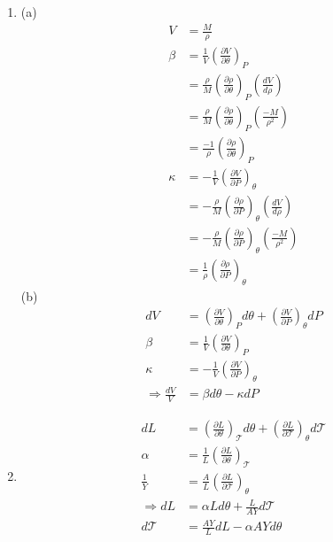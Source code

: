 \documentclass[a4paper,12pt]{article}
\begin{document}
\begin{enumerate}
	\item (a)
	\begin{align*}
		V &= \frac{M}{\rho} \\
		\beta &= \frac{1}{V} \left( \frac{\partial V}{\partial \theta} \right)_P \\
		&= \frac{\rho}{M} \left( \frac{\partial \rho}{\partial \theta} \right)_P \left( \frac{dV}{d\rho} \right) \\
		&= \frac{\rho}{M} \left( \frac{\partial \rho}{\partial \theta} \right)_P \left( \frac{-M}{\rho^2} \right) \\
		&= \frac{-1}{\rho} \left( \frac{\partial \rho}{\partial \theta} \right)_P \\
		\kappa &= - \frac{1}{V} \left( \frac{\partial V}{\partial P} \right)_\theta \\
		&= - \frac{\rho}{M} \left( \frac{\partial \rho}{\partial P} \right)_\theta \left( \frac{dV}{d\rho} \right) \\
		&= - \frac{\rho}{M} \left( \frac{\partial \rho}{\partial P} \right)_\theta \left( \frac{-M}{\rho^2} \right) \\
		&= \frac{1}{\rho} \left( \frac{\partial \rho}{\partial P} \right)_\theta
	\end{align*}
	(b)
	\begin{align*}
		dV &= \left( \frac{\partial V}{\partial \theta} \right)_P d\theta + \left( \frac{\partial V}{\partial P} \right)_\theta dP \\
		\beta &= \frac{1}{V} \left( \frac{\partial V}{\partial \theta} \right)_P \\
		\kappa &= - \frac{1}{V} \left( \frac{\partial V}{\partial P} \right)_\theta \\
		\Rightarrow \frac{dV}{V} &= \beta d\theta - \kappa dP
	\end{align*}
	
	\setcounter{enumi}{6}
	\item
	\begin{align*}
		dL &= \left( \frac{\partial L}{\partial \theta} \right)_\mathscr{T} d\theta + \left( \frac{\partial L}{\partial \mathscr{T}} \right) _\theta d\mathscr{T} \\
		\alpha &= \frac{1}{L} \left( \frac{\partial L}{\partial \theta} \right)_\mathscr{T} \\
		\frac{1}{Y} &= \frac{A}{L} \left( \frac{\partial L}{\partial \mathscr{T}} \right)_\theta \\
		\Rightarrow dL &= \alpha L d\theta + \frac{L}{AY} d\mathscr{T} \\
		d\mathscr{T} &= \frac{AY}{L} dL - \alpha AY d\theta
	\end{align*}
	

\end{enumerate}
\end{document}
